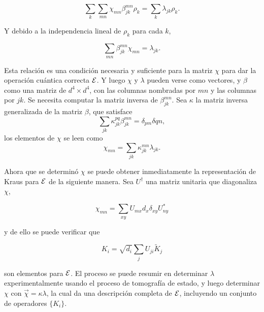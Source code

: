 \begin{equation}
\sum_k \sum_{mn}\chi_{mn}\beta_{jk}^{mn}\rho_k=\sum_k\lambda_{jk}\rho_k.
\end{equation}

Y debido a la independencia lineal de $\rho_k$ para cada $k$,

\begin{equation}
    \sum_{mn}\beta_{jk}^{mn}\chi_{mn}=\lambda_{jk}.
\end{equation}

Esta relación es una condición necesaria y suficiente para la matriz $\chi$ para dar la operación cuántica correcta $\mathcal{E}$. Y luego $\chi$ y $\lambda$ pueden verse como vectores, y $\beta$ como una matriz de $d^4\times d^4$, con las columnas nombradas por ${mn}$ y las columnas por ${jk}$. Se necesita computar la matriz inversa de $\beta_{jk}^{mn}$. Sea $\kappa$ la matriz inversa generalizada de la matriz $\beta$, que satisface \[\sum_{jk}\kappa_{jk}^{pq}\beta_{jk}^{mn}=\delta_{pm}\delta{qn},\] los elementos de $\chi$ se leen como 
\begin{equation}
    \chi_{mn}=\sum_{jk}\kappa_{jk}^{mn}\lambda_{jk}.
\end{equation}

Ahora que se determinó $\chi$ se puede obtener inmediatamente la representación de Kraus para $\mathcal{E}$ de la siguiente manera. Sea $U^\dagger$ una matriz unitaria que diagonaliza $\chi$,

\begin{equation}
    \chi_{mn}=\sum_{xy}U_{mx}d_x\delta_{xy}U_{ny}^*
\end{equation}

y de ello se puede verificar que 

\begin{equation}
    K_i=\sqrt{d_i} \sum_j U_{ji}\tilde{K}_j
\end{equation}


son elementos para $\mathcal{E}$. El proceso se puede resumir en determinar $\lambda$ experimentalmente usando el proceso de tomografía de estado, y luego determinar $\chi$ con $\vec{\chi}=\kappa\lambda$, la cual da una descripción completa de $\mathcal{E}$, incluyendo un conjunto de operadores $\{K_i\}$.








